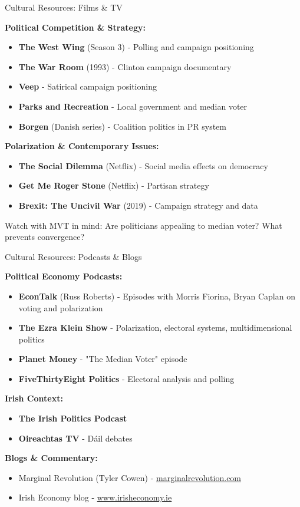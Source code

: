 \documentclass[10pt]{beamer}
\begin{document}
\begin{frame}{Cultural Resources: Films \& TV}
\footnotesize

\textbf{Political Competition \& Strategy:}
\begin{itemize}
\item \textbf{The West Wing} (Season 3) - Polling and campaign positioning
\item \textbf{The War Room} (1993) - Clinton campaign documentary
\item \textbf{Veep} - Satirical campaign positioning
\item \textbf{Parks and Recreation} - Local government and median voter
\item \textbf{Borgen} (Danish series) - Coalition politics in PR system
\end{itemize}


\textbf{Polarization \& Contemporary Issues:}
\begin{itemize}
\item \textbf{The Social Dilemma} (Netflix) - Social media effects on democracy
\item \textbf{Get Me Roger Stone} (Netflix) - Partisan strategy
\item \textbf{Brexit: The Uncivil War} (2019) - Campaign strategy and data
\end{itemize}


\alert{Watch with MVT in mind:} Are politicians appealing to median voter? What prevents convergence?
\end{frame}

\begin{frame}{Cultural Resources: Podcasts \& Blogs}
\footnotesize

\textbf{Political Economy Podcasts:}
\begin{itemize}
\item \textbf{EconTalk} (Russ Roberts) - Episodes with Morris Fiorina, Bryan Caplan on voting and polarization
\item \textbf{The Ezra Klein Show} - Polarization, electoral systems, multidimensional politics
\item \textbf{Planet Money} - "The Median Voter" episode
\item \textbf{FiveThirtyEight Politics} - Electoral analysis and polling
\end{itemize}


\textbf{Irish Context:}
\begin{itemize}
\item \textbf{The Irish Politics Podcast}
\item \textbf{Oireachtas TV} - Dáil debates
\end{itemize}


\textbf{Blogs \& Commentary:}
\begin{itemize}
\item Marginal Revolution (Tyler Cowen) - \url{marginalrevolution.com}
\item Irish Economy blog - \url{www.irisheconomy.ie}
\end{itemize}
\end{frame}
\end{document}
